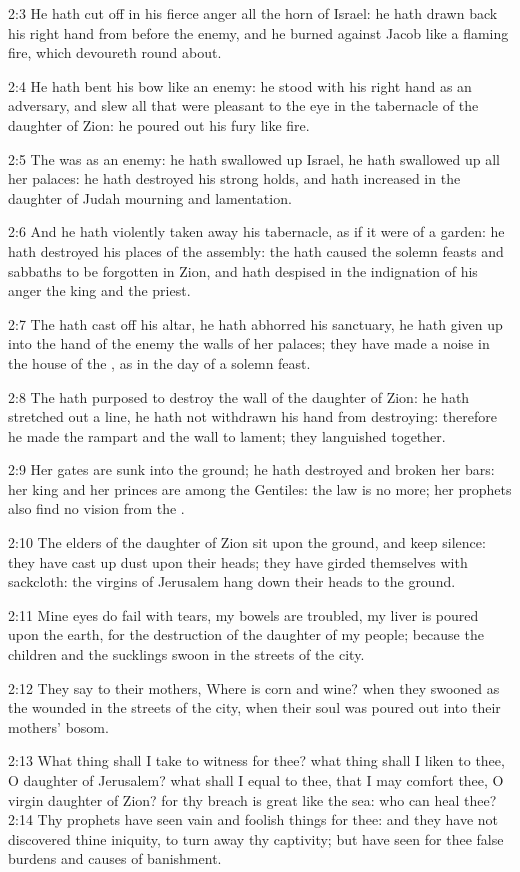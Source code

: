 2:3 He hath cut off in his fierce anger all the horn of Israel: he
hath drawn back his right hand from before the enemy, and he burned
against Jacob like a flaming fire, which devoureth round about.

2:4 He hath bent his bow like an enemy: he stood with his right hand
as an adversary, and slew all that were pleasant to the eye in the
tabernacle of the daughter of Zion: he poured out his fury like fire.

2:5 The \LORD was as an enemy: he hath swallowed up Israel, he hath
swallowed up all her palaces: he hath destroyed his strong holds, and
hath increased in the daughter of Judah mourning and lamentation.

2:6 And he hath violently taken away his tabernacle, as if it were of
a garden: he hath destroyed his places of the assembly: the \LORD hath
caused the solemn feasts and sabbaths to be forgotten in Zion, and
hath despised in the indignation of his anger the king and the priest.

2:7 The \LORD hath cast off his altar, he hath abhorred his sanctuary,
he hath given up into the hand of the enemy the walls of her palaces;
they have made a noise in the house of the \LORD, as in the day of a
solemn feast.

2:8 The \LORD hath purposed to destroy the wall of the daughter of
Zion: he hath stretched out a line, he hath not withdrawn his hand
from destroying: therefore he made the rampart and the wall to lament;
they languished together.

2:9 Her gates are sunk into the ground; he hath destroyed and broken
her bars: her king and her princes are among the Gentiles: the law is
no more; her prophets also find no vision from the \LORD.

2:10 The elders of the daughter of Zion sit upon the ground, and keep
silence: they have cast up dust upon their heads; they have girded
themselves with sackcloth: the virgins of Jerusalem hang down their
heads to the ground.

2:11 Mine eyes do fail with tears, my bowels are troubled, my liver is
poured upon the earth, for the destruction of the daughter of my
people; because the children and the sucklings swoon in the streets of
the city.

2:12 They say to their mothers, Where is corn and wine? when they
swooned as the wounded in the streets of the city, when their soul was
poured out into their mothers' bosom.

2:13 What thing shall I take to witness for thee? what thing shall I
liken to thee, O daughter of Jerusalem? what shall I equal to thee,
that I may comfort thee, O virgin daughter of Zion? for thy breach is
great like the sea: who can heal thee?  2:14 Thy prophets have seen
vain and foolish things for thee: and they have not discovered thine
iniquity, to turn away thy captivity; but have seen for thee false
burdens and causes of banishment.

